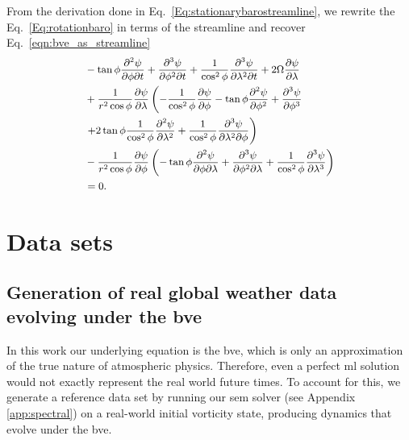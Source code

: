 \documentclass[aps,pra,a4paper,twocolumn,longbibliography,groupedaddress]{revtex4-2}
\begin{document}
From the derivation done in Eq.~\eqref{Eq:stationarybarostreamline}, we rewrite the Eq.~\eqref{Eq:rotationbaro} in terms of the streamline and recover Eq.~\eqref{eqn:bve_as_streamline}
\begin{equation}
\small
       \begin{split}
      &  -\tan\phi\frac{\partial^2 \psi}{\partial \phi \partial t} + \frac{\partial^3 \psi}{\partial \phi^2 \partial t} + \frac{1}{\cos^2\phi}\frac{\partial^3 \psi}{\partial \lambda^2 \partial t} + 2\Omega \frac{\partial \psi}{\partial \lambda}  \\
      &+ \frac{1}{r^2 \cos\phi}\frac{\partial \psi}{\partial \lambda}\left( -\frac{1}{\cos^2\phi} \frac{\partial \psi}{\partial \phi} - \tan\phi\frac{\partial^2 \psi}{\partial \phi^2} + \frac{\partial^3 \psi}{\partial \phi^3}\right. \\
      & \left. + 2\tan\phi\frac{1}{\cos^2\phi}\frac{\partial^2 \psi}{\partial \lambda^2}  + \frac{1}{\cos^2\phi}\frac{\partial^3 \psi}{\partial \lambda^2 \partial \phi} \right) \\
      & - \frac{1}{r^2 \cos\phi}\frac{\partial \psi}{\partial \phi}\left(-\tan\phi\frac{\partial^2 \psi}{\partial \phi \partial \lambda} + \frac{\partial^3 \psi}{\partial \phi^2 \partial \lambda} + \frac{1}{\cos^2\phi}\frac{\partial^3 \psi}{\partial \lambda^3} \right) \\
      &= 0.
    \end{split}
\label{Eq:rotationbarostreamline}
\end{equation}


\section{Data sets}\label{app:data_sets}

\subsection{Generation of real global weather data evolving under the \gls{bve}}\label{app:real_world_data}

In this work our underlying equation is the \gls{bve}, which is only an approximation of the true nature of atmospheric physics. Therefore, even a perfect \gls{ml} solution would not exactly represent the real world future times. To account for this, we generate a reference data set by running our \gls{sem} solver (see Appendix \ref{app:spectral}) on a real-world initial vorticity state, producing dynamics that evolve under the \gls{bve}.
\end{document}

